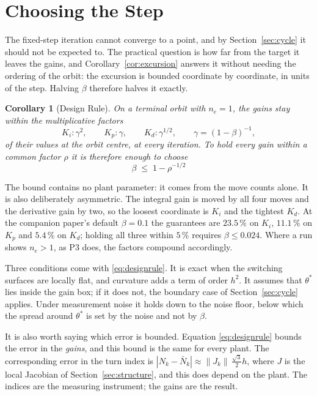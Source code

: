 \documentclass[letterpaper, 10pt, conference, twocolumn]{ieeeconf}
\newtheorem{corollary}{Corollary}
\newcommand{\Nbar}{\bar{N}}
\begin{document}
\section{Choosing the Step}
\label{sec:size}

The fixed-step iteration cannot converge to a point, and by
Section~\ref{sec:cycle} it should not be expected to. The practical question is
how far from the target it leaves the gains, and
Corollary~\ref{cor:excursion} answers it without needing the ordering of the
orbit: the excursion is bounded coordinate by coordinate, in units of the step.
Halving $\beta$ therefore halves it exactly.

\begin{corollary}[Design Rule]
\label{cor:design}
On a terminal orbit with $n_e = 1$, the gains stay within the multiplicative
factors
\begin{equation}
K_i : \gamma^{2}, \qquad K_p : \gamma, \qquad K_d : \gamma^{1/2},
\qquad \gamma = (1-\beta)^{-1},
\label{eq:designfwd}
\end{equation}
of their values at the orbit centre, at every iteration. To hold every gain
within a common factor $\rho$ it is therefore enough to choose
\begin{equation}
\boxed{\;\beta \;\le\; 1 - \rho^{-1/2}\;}
\label{eq:designrule}
\end{equation}
\end{corollary}

The bound contains no plant parameter: it comes from the move counts alone.
It is also deliberately asymmetric. The integral gain is moved by all four
moves and the derivative gain by two, so the loosest coordinate is $K_i$ and
the tightest $K_d$. At the companion paper's default $\beta = 0.1$ the
guarantees are $23.5\,\%$ on $K_i$, $11.1\,\%$ on $K_p$ and $5.4\,\%$ on
$K_d$; holding all three within $5\,\%$ requires $\beta \le 0.024$. Where a
run shows $n_e > 1$, as P3 does, the factors compound accordingly.

Three conditions come with \eqref{eq:designrule}. It is exact when the
switching surfaces are locally flat, and curvature adds a term of order $h^2$.
It assumes that $\theta^*$ lies inside the gain box; if it does not, the
boundary case of Section~\ref{sec:cycle} applies. Under measurement noise it
holds down to the noise floor, below which the spread around $\theta^*$ is set
by the noise and not by $\beta$.

It is also worth saying which error is bounded. Equation
\eqref{eq:designrule} bounds the error in the \emph{gains}, and this bound is
the same for every plant. The corresponding error in the turn index is
$|N_k - \Nbar_k| \approx \|J_k\| \, \tfrac{\sqrt{3}}{2} h$, where $J$ is the
local Jacobian of Section~\ref{sec:structure}, and this does depend on the
plant. The indices are the measuring instrument; the gains are the result.
\end{document}
